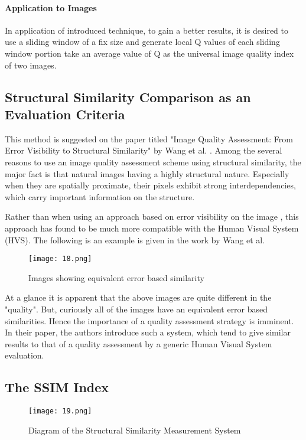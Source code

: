 \paragraph*{\textbf{Application to Images}}
In application of introduced technique, to gain a better results, it is desired to use a sliding window of a fix size and generate local Q values of each sliding window portion take an average value of Q as the universal image quality index of two images.

\subsection{Structural Similarity Comparison as an Evaluation Criteria}
This method is suggested on the paper titled "Image Quality Assessment: From Error Visibility to Structural Similarity" by Wang et al. \cite{Wang2004}. Among the several reasons to use an image quality assessment scheme using structural similarity, the major fact is that natural images having a highly structural nature. Especially when they are spatially proximate, their pixels exhibit strong interdependencies, which carry important information on the structure.

Rather than when using an approach based on error visibility on the image \cite{Mannos74}, this approach has found to be much more compatible with the Human Visual System (HVS). The following is an example is given in the work by Wang et al.

\begin{figure}[htbp]
\sidecaption
\texttt{[image: 18.png]}
\caption{Images showing equivalent error based similarity}
\label{Fig_2_err_sim}       %
\end{figure}

At a glance it is apparent that the above images are quite different in the "quality". But, curiously all of the images have an equivalent error based similarities. Hence the importance of a quality assessment strategy is imminent. In their paper, the authors introduce such a system, which tend to give similar results to that of a quality assessment by a generic Human Visual System evaluation.

\subsection{The SSIM Index}

\begin{figure}[htbp]
\sidecaption
\texttt{[image: 19.png]}
\caption{Diagram of the Structural Similarity Measurement System}
\label{Fig_2_ssim_design}       %
\end{figure}

